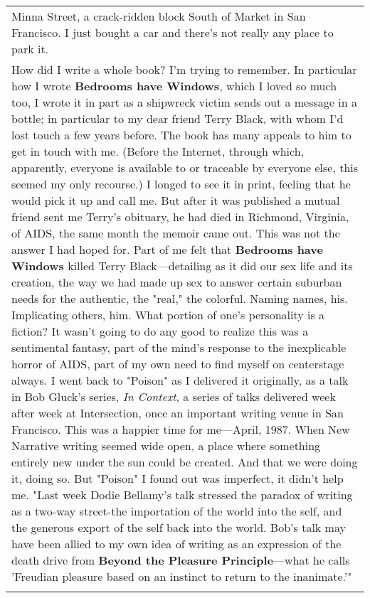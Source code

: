 \begin{longtable}[]{@{}l@{}}
\begin{minipage}[t]{0.97\columnwidth}
Minna Street, a crack-ridden block South of Market in San Francisco. I
just bought a car and there's not really any place to park it.\strut
\end{minipage}\tabularnewline
\begin{minipage}[t]{0.97\columnwidth}\raggedright
How did I write a whole book? I'm trying to remember. In particular how
I wrote \textbf{Bedrooms have Windows}, which I loved so much too, I
wrote it in part as a shipwreck victim sends out a message in a bottle;
in particular to my dear friend Terry Black, with whom I'd lost touch a
few years before. The book has many appeals to him to get in touch with
me. (Before the Internet, through which, apparently, everyone is
available to or traceable by everyone else, this seemed my only
recourse.) I longed to see it in print, feeling that he would pick it up
and call me. But after it was published a mutual friend sent me Terry's
obituary, he had died in Richmond, Virginia, of AIDS, the same month the
memoir came out. This was not the answer I had hoped for. Part of me
felt that \textbf{Bedrooms have Windows} killed Terry Black---detailing
as it did our sex life and its creation, the way we had made up sex to
answer certain suburban needs for the authentic, the "real," the
colorful. Naming names, his. Implicating others, him. What portion of
one's personality is a fiction? It wasn't going to do any good to
realize this was a sentimental fantasy, part of the mind's response to
the inexplicable horror of AIDS, part of my own need to find myself on
centerstage always. I went back to "Poison" as I delivered it
originally, as a talk in Bob Gluck's series, \emph{In Context}, a series
of talks delivered week after week at Intersection, once an important
writing venue in San Francisco. This was a happier time for me---April,
1987. When New Narrative writing seemed wide open, a place where
something entirely new under the sun could be created. And that we were
doing it, doing so. But "Poison" I found out was imperfect, it didn't
help me. "Last week Dodie Bellamy's talk stressed the paradox of writing
as a two-way street-the importation of the world into the self, and the
generous export of the self back into the world. Bob's talk may have
been allied to my own idea of writing as an expression of the death
drive from \textbf{Beyond the Pleasure Principle}---what he calls
'Freudian pleasure based on an instinct to return to the
inanimate.'"\strut
\end{minipage}\tabularnewline
\begin{minipage}[t]{0.97\columnwidth}\raggedright

\end{minipage}
\end{longtable}
